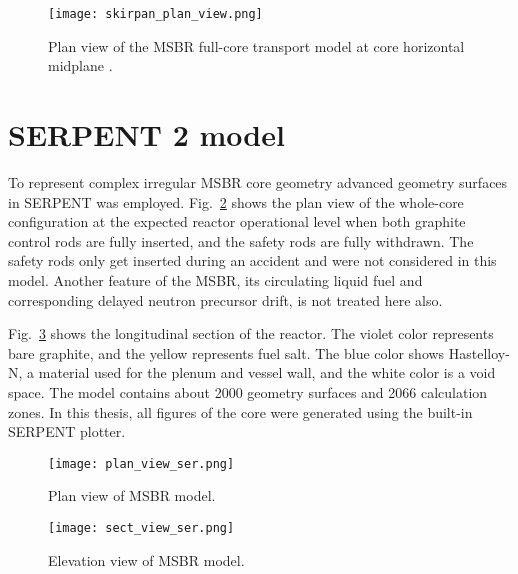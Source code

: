 \begin{figure}[hbp!] %
  \centering
  \vspace{-0.3em}
  \texttt{[image: skirpan\_plan\_view.png]}
  \caption{Plan view of the \gls{MSBR} full-core transport model at core horizontal midplane \cite{skirpan_fuel_2017}.}
  \vspace{-0.6em}
  \label{fig:skirpan_plan}
\end{figure}
\FloatBarrier

\section{SERPENT 2 model}

To represent complex irregular \gls{MSBR} core geometry advanced geometry surfaces in SERPENT was employed. Fig.~\ref{fig:serpent_plan_view} shows the plan view of the whole-core configuration at the expected reactor operational level when both graphite control rods are fully inserted, and the safety rods are fully withdrawn. The safety rods only get inserted during an accident and were not considered in this model. Another feature of the \gls{MSBR}, its circulating liquid fuel and corresponding delayed neutron precursor drift, is not treated
here also. 

Fig.~\ref{fig:serpent_sectional_view} shows the longitudinal section of the reactor. The violet color represents bare graphite, and the yellow represents fuel salt. The blue color shows Hastelloy-N, a material used for the plenum and vessel wall, and the white color is a void space. The model contains about 2000 geometry surfaces and 2066 calculation zones. In this thesis, all figures of the core were generated using the built-in SERPENT plotter.

\begin{figure}[hbp!] %
  \centering
  \vspace{-0.3em}
  \texttt{[image: plan\_view\_ser.png]}
  \caption{Plan view of \gls{MSBR} model.}
  \vspace{-0.6em}
  \label{fig:serpent_plan_view}
\end{figure}
\FloatBarrier

\begin{figure}[hbp!] %
  \centering
  \vspace{-0.3em}
  \texttt{[image: sect\_view\_ser.png]}
  \caption{Elevation view of \gls{MSBR} model.}
  \vspace{-0.6em}
  \label{fig:serpent_sectional_view}
\end{figure}
\FloatBarrier

